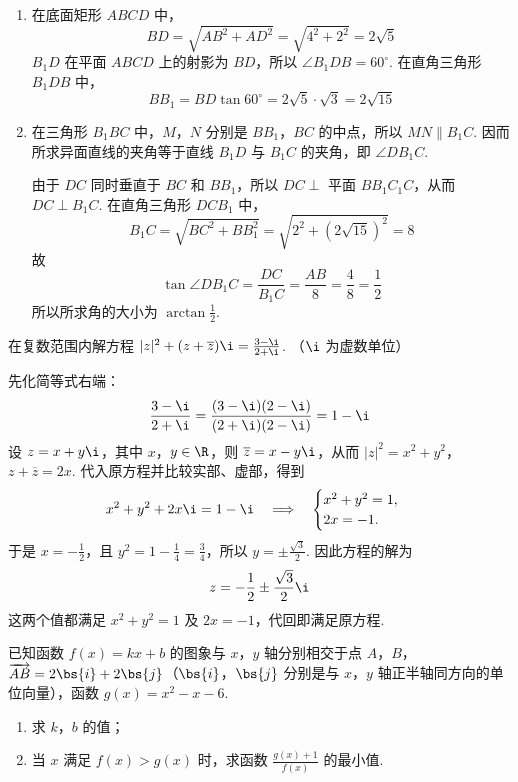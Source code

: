 \begin{solution}
\begin{enumerate}
\item 在底面矩形 \(ABCD\) 中，
\[
BD=\sqrt{AB^2+AD^2}=\sqrt{4^2+2^2}=2\sqrt5
\]
\(B_1D\) 在平面 \(ABCD\) 上的射影为 \(BD\)，所以 \(\angle B_1DB=60^{\circ}\). 在直角三角形 \(B_1DB\) 中，
\[
BB_1=BD\tan60^{\circ}=2\sqrt5\cdot\sqrt3=2\sqrt{15}
\]

\item 在三角形 \(B_1BC\) 中，\(M\)，\(N\) 分别是 \(BB_1\)，\(BC\) 的中点，所以 \(MN\parallel B_1C\). 因而所求异面直线的夹角等于直线 \(B_1D\) 与 \(B_1C\) 的夹角，即 \(\angle DB_1C\).

由于 \(DC\) 同时垂直于 \(BC\) 和 \(BB_1\)，所以 \(DC\perp\) 平面 \(BB_1C_1C\)，从而 \(DC\perp B_1C\). 在直角三角形 \(DCB_1\) 中，
\[
B_1C=\sqrt{BC^2+BB_1^2}=\sqrt{2^2+(2\sqrt{15})^2}=8
\]
故
\[
\tan\angle DB_1C=\frac{DC}{B_1C}=\frac{AB}{8}=\frac{4}{8}=\frac12
\]
所以所求角的大小为 \(\arctan\frac12\).
\end{enumerate}
\end{solution}

\begin{problem}
在复数范围内解方程 \(|z|^2 + (z + \overline{z})\i = \frac{3 - \i}{2 + \i}\). （\(\i\) 为虚数单位）
\end{problem}

\begin{solution}
先化简等式右端：
\[
\frac{3-\i}{2+\i}=\frac{(3-\i)(2-\i)}{(2+\i)(2-\i)}=1-\i
\]
设 \(z=x+y\i\)，其中 \(x\)，\(y\in\R\)，则 \(\overline z=x-y\i\)，从而
\(|z|^2=x^2+y^2\)，\(z+\overline z=2x\).
代入原方程并比较实部、虚部，得到
\[
x^2+y^2+2x\i=1-\i\quad\Longrightarrow\quad
\begin{cases}
x^2+y^2=1,\\
2x=-1.
\end{cases}
\]
于是 \(x=-\frac12\)，且 \(y^2=1-\frac14=\frac34\)，所以 \(y=\pm\frac{\sqrt3}{2}\). 因此方程的解为
\[
z=-\frac12\pm\frac{\sqrt3}{2}\i
\]
这两个值都满足 \(x^2+y^2=1\) 及 \(2x=-1\)，代回即满足原方程.
\end{solution}

\begin{problem}
已知函数 \( f(x) = kx + b \) 的图象与 \(x\)，\(y\) 轴分别相交于点 \(A\)，\(B\)，\(\overrightarrow{AB} = 2\bs{i} + 2\bs{j}\)（\(\bs{i}\)，\(\bs{j}\) 分别是与 \(x\)，\(y\) 轴正半轴同方向的单位向量），函数 \( g(x) = x^2 - x - 6 \).

\begin{enumerate}
\item 求 \(k\)，\(b\) 的值；
\item 当 \(x\) 满足 \(f(x) > g(x)\) 时，求函数 \(\frac{g(x) + 1}{f(x)}\) 的最小值.
\end{enumerate}
\end{problem}

